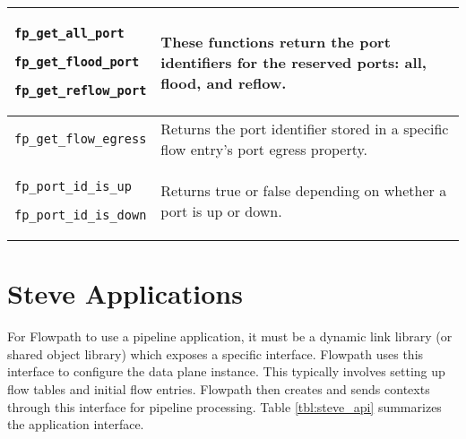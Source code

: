 \begin{table}
\begin{center}
\begin{tabular}{| p{0.3\linewidth} | p{0.7\linewidth} |}

\texttt{fp\_get\_all\_port}

\texttt{fp\_get\_flood\_port}

\texttt{fp\_get\_reflow\_port} &

These functions return the port identifiers for the reserved ports: all, flood, and reflow. \\

\hline


\texttt{fp\_get\_flow\_egress} & Returns the port identifier stored in a specific flow entry's port egress property. \\

\hline


\texttt{fp\_port\_id\_is\_up}

\texttt{fp\_port\_id\_is\_down} &

Returns true or false depending on whether a port is up or down. \\

\hline

\end{tabular}
\end{center}
\label{tbl:flowpath_api}
\end{table}

\section{Steve Applications} \label{fp:app_interface}

For Flowpath to use a pipeline application, it must be a dynamic link library (or shared object library) which exposes a specific interface. Flowpath uses this interface to configure the data plane instance. This typically involves setting up flow tables and initial flow entries. Flowpath then creates and sends contexts through this interface for pipeline processing. Table \ref{tbl:steve_api} summarizes the application interface.

